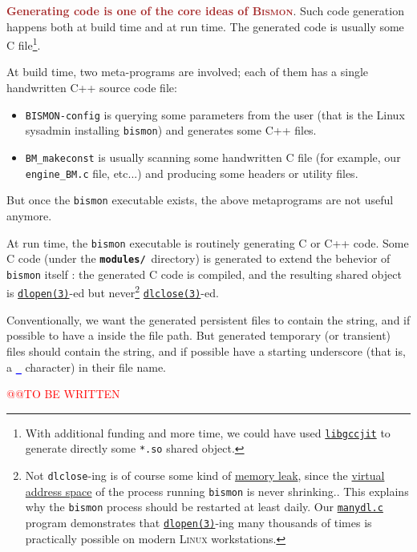 \textcolor{brown}{\textbf{Generating code is one of the core ideas of \textsc{Bismon}}}. Such code
generation happens both at build time and at run time. The generated
code is usually some C file\footnote{With additional funding and more
time, we could have used
\href{https://gcc.gnu.org/onlinedocs/jit/}{\texttt{libgccjit}} to
generate directly some \texttt{*.so} shared object.}.

At build time, two meta-programs are involved; each of them has a
single handwritten C++ source code file:

\begin{itemize}
  \item \texttt{BISMON-config}
     is
    querying some parameters from the user (that is the Linux sysadmin
    installing \texttt{bismon}) and generates some C++ files.

  \item \texttt{BM\_makeconst}
     is usually
    scanning some handwritten C file (for example, our
    \texttt{engine\_BM.c} file, etc...)  and producing some headers or
    utility files.
\end{itemize}

But once the \texttt{bismon} executable exists, the above metaprograms
are not useful anymore.

At run time, the \texttt{bismon} executable is routinely generating C
or C++ code. Some C code (under the \textbf{\texttt{modules/}}\,
directory) is generated to extend the behevior of \texttt{bismon}
itself : the generated C code is compiled, and the resulting shared
object is
\href{https://man7.org/linux/man-pages/man3/dlopen.3.html}{\texttt{dlopen(3)}}-ed
but never\footnote{Not \texttt{dlclose}-ing is of course some kind of
\href{https://en.wikipedia.org/wiki/Memory_leak}{memory leak}, since
the \href{https://en.wikipedia.org/wiki/Virtual_address_space}{virtual
  address space} of the process running \texttt{bismon} is never
shrinking.. This explains why the \texttt{bismon} process should be
restarted at least daily.  Our
\href{https://github.com/bstarynk/misc-basile/blob/master/manydl.c}{\texttt{manydl.c}}
program demonstrates that
\href{https://man7.org/linux/man-pages/man3/dlopen.3.html}{\texttt{dlopen(3)}}-ing
many thousands of times is practically possible on modern
\textsc{Linux} workstations.}
\href{https://man7.org/linux/man-pages/man3/dlclose.3.html}{\texttt{dlclose(3)}}-ed.

  Conventionally, we
want the generated persistent files to contain the
\texttt{\textsection} string, and
if possible to have a \texttt{\textsection} inside the file path.  But
generated temporary (or transient) files should contain the
\texttt{\textcurrency} string, and if possible
 have
a starting underscore (that is, a
\textcolor{blue}{\large\textbf{\texttt{\_}}} character) in their file
name.

{\textcolor{red}{\large @@TO BE WRITTEN}}
